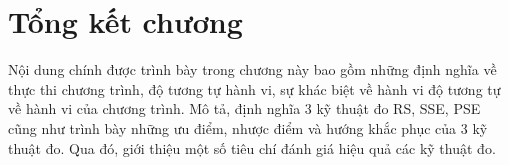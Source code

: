 %
%

\section*{Tổng kết chương}
Nội dung chính được trình bày trong chương này bao gồm những định nghĩa về thực thi chương trình, độ tương tự hành vi, sự khác biệt về hành vi độ tương tự về hành vi của chương trình. Mô tả, định nghĩa 3 kỹ thuật đo RS, SSE, PSE cũng như trình bày những ưu điểm, nhược điểm và hướng khắc phục của 3 kỹ thuật đo. Qua đó, giới thiệu một số tiêu chí đánh giá hiệu quả các kỹ thuật đo.
